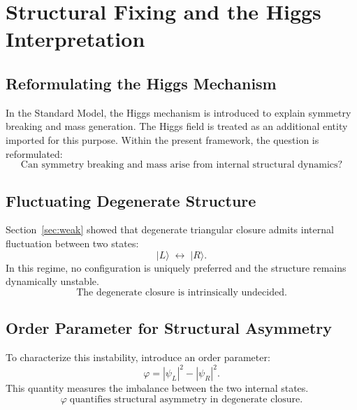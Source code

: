 \section{Structural Fixing and the Higgs Interpretation}
\label{sec:higgs}

\subsection{Reformulating the Higgs Mechanism}

In the Standard Model, the Higgs mechanism is introduced to explain
symmetry breaking and mass generation.
The Higgs field is treated as an additional entity imported for this purpose.
Within the present framework, the question is reformulated:
\begin{equation}
  \boxed{
    \text{Can symmetry breaking and mass arise from internal
    structural dynamics?}
  }
\end{equation}

\subsection{Fluctuating Degenerate Structure}

Section~\ref{sec:weak} showed that degenerate triangular closure
admits internal fluctuation between two states:
\begin{equation}
  |L\rangle \;\leftrightarrow\; |R\rangle.
\end{equation}
In this regime, no configuration is uniquely preferred
and the structure remains dynamically unstable.
\begin{equation}
  \boxed{\text{The degenerate closure is intrinsically undecided.}}
\end{equation}

\subsection{Order Parameter for Structural Asymmetry}

To characterize this instability, introduce an order parameter:
\begin{equation}
  \label{eq:higgs_order}
  \varphi = |\psi_L|^2 - |\psi_R|^2.
\end{equation}
This quantity measures the imbalance between the two internal states.
\begin{equation}
  \boxed{\varphi \;\text{quantifies structural asymmetry in degenerate closure.}}
\end{equation}

